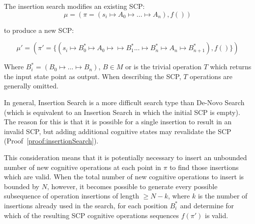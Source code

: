 The insertion search modifies an existing SCP:
\[\mu=(\pi=(s_i \longmapsto A_0 \longmapsto ... \longmapsto A_n),f())\]

to produce a new SCP:

\[
\mu'=(\pi'=\{(s_i \longmapsto B^*_0 \longmapsto A_0 \longmapsto \longmapsto B^*_1... \longmapsto  B^*_n \longmapsto A_n \longmapsto  B^*_{n+1}),f()\})
\] 

Where $B^*_i = (B_0\longmapsto ...\longmapsto B_n)$, $B \in M$  or is the trivial operation $T$ which returns the input state point as output. When describing the SCP, $T$ operations are generally omitted.

In general, Insertion Search is a more difficult search type than De-Novo Search (which is equivalent to an Insertion Search in which the initial SCP is empty). The reason for this is that it is possible for a single insertion to result in an invalid SCP, but adding additional cognitive states may revalidate the SCP (Proof~\ref{proof:insertionSearch}).

This consideration means that it is potentially necessary to insert an unbounded number of new cognitive operations at each point in $\pi$ to find those insertions which are valid. When the total number of new cognitive operations to insert is bounded by $N$, however, it becomes possible to generate every possible subsequence of operation insertions of length $\geq N-k$, where $k$ is the number of insertions already used in the search, for each position $B^*_i$ and determine for which of the resulting SCP cognitive operations sequences $f(\pi')$ is valid.












